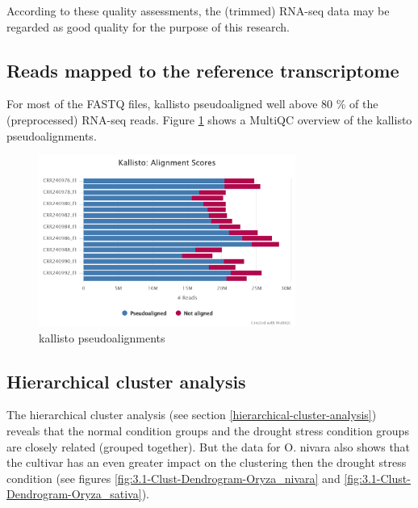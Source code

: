 According to these quality assessments, the (trimmed) RNA-seq data may be regarded as good quality for the purpose of this research.


\subsection{Reads mapped to the reference transcriptome}

For most of the FASTQ files, kallisto pseudoaligned well above 80 \% of the (preprocessed) RNA-seq reads. Figure \ref{fig:0.3-MultiQC_kallisto_alignment} shows a MultiQC overview of the kallisto pseudoalignments.

\begin{figure}[htbp]
    \caption{kallisto pseudoalignments}
    \label{fig:0.3-MultiQC_kallisto_alignment}
    \includegraphics[width=0.75\textwidth]{../../results/multiqc/Plot-Exports/kallisto_alignment}
\end{figure}


\subsection{Hierarchical cluster analysis}

The hierarchical cluster analysis  (see section \ref{hierarchical-cluster-analysis}) reveals that the normal condition groups and the drought stress condition groups are closely related (grouped together). But the data for O. nivara also shows that the cultivar has an even greater impact on the clustering then the drought stress condition (see figures \ref{fig:3.1-Clust-Dendrogram-Oryza_nivara} and \ref{fig:3.1-Clust-Dendrogram-Oryza_sativa}).

